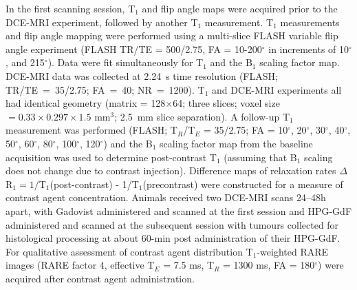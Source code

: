 In the first scanning session, T$_1$ and flip angle maps were acquired prior to the \acs{DCE-MRI} experiment, followed by another T$_1$ measurement.
T$_1$ measurements and flip angle mapping were performed using a multi-slice FLASH variable flip angle experiment (FLASH TR/TE = 500/2.75, FA = 10-200$^{\circ}$ in increments of 10$^{\circ}$, and 215$^{\circ}$).
Data were fit simultaneously for T$_1$ and the B$_1$ scaling factor map.
\acs{DCE-MRI} data was collected at 2.24~s time resolution (FLASH; TR/TE~=~35/2.75; FA~=~40; NR~=~1200).
T$_1$ and \acs{DCE-MRI} experiments all had identical geometry (matrix = 128$\times$64; three slices; voxel size$=0.33\times 0.297\times 1.5$ mm$^3$; 2.5~mm slice separation).
A follow-up T$_1$ measurement was performed (FLASH; T$_R$/T$_E$ = 35/2.75; FA = 10$^{\circ}$, 20$^{\circ}$, 30$^{\circ}$, 40$^{\circ}$, 50$^{\circ}$, 60$^{\circ}$, 80$^{\circ}$, 100$^{\circ}$, 120$^{\circ}$) and the B$_1$ scaling factor map from the baseline acquisition was used to determine post-contrast T$_1$ (assuming that B$_1$ scaling does not change due to contrast injection).
Difference maps of relaxation rates $\Delta$R$_1=1/$T$_1$(post-contrast) - 1/T$_1$(precontrast) were constructed for a measure of contrast agent concentration.
Animals received two \acs{DCE-MRI} scans 24--48h apart, with Gadovist administered and scanned at the first session and \acs{HPG-GdF} administered and scanned at the subsequent session with tumours collected for histological processing at about 60-min post administration of their \acs{HPG-GdF}.
For qualitative assessment of contrast agent distribution  T$_1$-weighted \acs{RARE} images (RARE factor 4, effective T$_E$ = 7.5 ms, T$_R$ = 1300 ms, FA = 180$^{\circ}$) were acquired after contrast agent administration.

